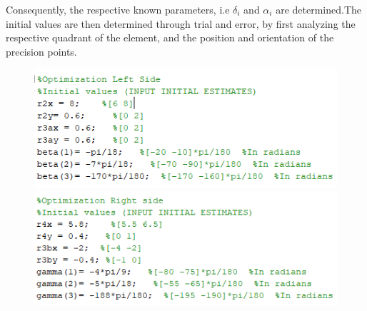 \documentclass[12pt]{article}
\begin{document}
Consequently, the respective known parameters, i.e $\delta_i$ and $\alpha_i$ are determined.The initial values are then determined through trial and error, by first analyzing the respective quadrant of the element, and the position and orientation of the precision points.
\begin{figure}[h!]
    \centering
    \begin{minipage}{.5\textwidth}
        \centering
        \includegraphics[width=1\textwidth]{MG_6.png}
    \end{minipage}%
    \begin{minipage}{0.5\textwidth}
        \centering
        \includegraphics[width=1\textwidth]{MG_7.png}
    \end{minipage}
\end{figure}
\end{document}
